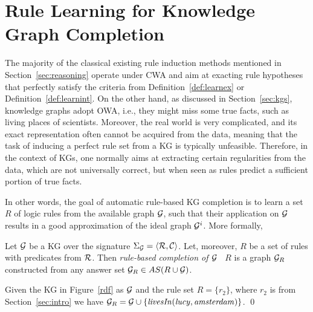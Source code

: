 \section{ Rule Learning for Knowledge Graph Completion}
\label{sec:rules_kg_completion}
The majority of the classical existing rule induction methods mentioned in Section~\ref{sec:reasoning} operate under CWA and aim at exacting rule hypotheses that perfectly satisfy the criteria from Definition~\ref{def:learnex} or Definition~\ref{def:learnint}.
On the other hand, as discussed in Section~\ref{sec:kgs}, knowledge graphs adopt OWA, i.e., they might miss some true facts, such as living places of scientists. Moreover, the real world is very complicated, and its exact representation often cannot be acquired from the data, meaning that the task of inducing a perfect rule set from a KG is typically unfeasible. Therefore, in the context of KGs, one normally aims at extracting certain regularities from the data, which are not universally correct, but when seen as rules predict a sufficient portion of true facts. 

In other words, the goal of automatic rule-based KG completion is to learn a set $R$ of logic rules from the available graph $\mathcal{G}$, such that their application on $\mathcal{G}$ results in a good approximation of the ideal graph $\mathcal{G}^i$. More formally,



 \begin{definition}\label{def:kgcomp} Let $\mathcal{G}$ be a KG  over the signature $\Sigma_{\mathcal{G}}=\langle\mathcal{R},\mathcal{C}\rangle$. Let, moreover, $R$ be a set of rules with predicates from $\mathcal{R}$. 
 Then \emph{rule-based completion of $\mathcal{G}$ \wrt\ $R$} is a graph $\mathcal{G}_{R}$ constructed from any answer set $\mathcal{G}_{R}\in AS(R \cup \mathcal{G})$. 
 \end{definition}
 
 \begin{example}
 Given the KG in Figure~\ref{rdf} as $\mathcal{G}$ and the rule set $R=\{r_2\}$, where $r_2$ is from Section~\ref{sec:intro} 
 we have $\mathcal{G}_{R}=\mathcal{G} \cup \{\mathit{livesIn(lucy,amsterdam)}\}$. \qed
 \end{example}

